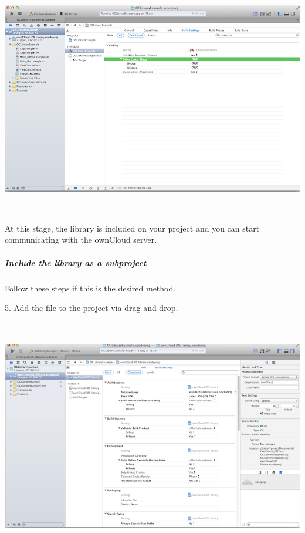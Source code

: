 \documentclass[letterpaper,10pt,english]{sphinxmanual}
\begin{document}
\includegraphics[width=16.261cm,height=10.246cm]{100002010000034700000211B6BE4A2B.png}

At this stage, the library is included on your project and you can start
communicating with the ownCloud server.


\subparagraph{Include the library as a subproject}
\label{ios_library/library_installation:include-the-library-as-a-subproject}
Follow these steps if this is the desired method.

5. Add the file  to the project via drag and
drop.

\includegraphics[width=16.51cm,height=10.285cm]{100000000000030C000001E61DFDBF76.png}
\end{document}

